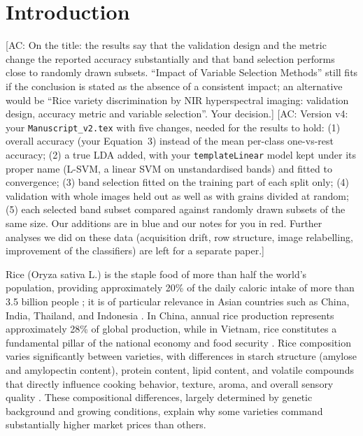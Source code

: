 \documentclass[final,5p,times,twocolumn]{elsarticle}
\newcommand{\acnote}[1]{{\color{red}\small\textsf{[AC: #1]}}}
\begin{document}

\section{Introduction}\label{sec1}
\acnote{On the title: the results say that the validation design and the metric change the reported accuracy substantially and that band selection performs close to randomly drawn subsets. ``Impact of Variable Selection Methods'' still fits if the conclusion is stated as the absence of a consistent impact; an alternative would be ``Rice variety discrimination by NIR hyperspectral imaging: validation design, accuracy metric and variable selection''. Your decision.}
\acnote{Version v4: your \texttt{Manuscript\_v2.tex} with five changes, needed for the results to hold: (1) overall accuracy (your Equation~3) instead of the mean per-class one-vs-rest accuracy; (2) a true LDA added, with your \texttt{templateLinear} model kept under its proper name (L-SVM, a linear SVM on unstandardised bands) and fitted to convergence; (3) band selection fitted on the training part of each split only; (4) validation with whole images held out as well as with grains divided at random; (5) each selected band subset compared against randomly drawn subsets of the same size. Our additions are in blue and our notes for you in red. Further analyses we did on these data (acquisition drift, row structure, image relabelling, improvement of the classifiers) are left for a separate paper.}

Rice (Oryza sativa L.) is the staple food of more than half the world's population, providing approximately 20\% of the daily caloric intake of more than 3.5 billion people \cite{subbuthavamurugan2023}; it is of particular relevance in Asian countries such as China, India, Thailand, and Indonesia \cite{Muthayya2014}. 
In China, annual rice production represents approximately 28\% of global production, while in Vietnam, rice constitutes a fundamental pillar of the national economy and food security \cite{Giang2020b, Tong2021}. 
Rice composition varies significantly between varieties, with differences in starch structure (amylose and amylopectin content), protein content, lipid content, and volatile compounds that directly influence cooking behavior, texture, aroma, and overall sensory quality \cite{Sampaio2019,Xie2024}. 
These compositional differences, largely determined by genetic background and growing conditions, explain why some varieties command substantially higher market prices than others.
\end{document}
